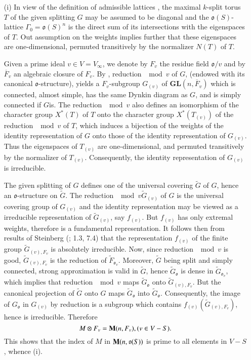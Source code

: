 \begin{itemize}
\item[(i)] In view of the definition of admissible lattices \cite{art04-key10}, the maximal $k$-split torus $T$ of the given splitting $G$ may be assumed to be diagonal and the $\mathfrak{o}(S)$-lattice $\Gamma_{0}=\mathfrak{o}(S)^{n}$ is the direct sum of its intersections with the eigenspaces of $T$. Out assumption on the weights implies further that these eigenspaces are one-dimensional, permuted transitively by the normalizer $N(T)$ of $T$.

Given a prime ideal $v\in V=V_{\infty}$, we denote by $F_{v}$ the residue field $\mathfrak{o}/v$ and by $\overline{F}_{v}$ an algebraic closure of $F_{v}$. By \cite{art04-key10}, reduction $\mod v$ of $G$, (endowed with its canonical $\mathfrak{o}$-structure), yields a $F_{v}$-subgroup $G_{(v)}$ of $\mathbf{GL}(n,\overline{F}_{v})$ which is connected, almost simple, has the same Dynkin diagram as $G$, and is simply connected if $G$\pageoriginale is. The reduction $\mod v$ also defines an isomorphism of the character group $X^{*}(T)$ of $T$ onto the character group $X^{*}(T_{(v)})$ of the reduction $\mod v$ of $T$, which induces a bijection of the weights of the identity representation of $G$ onto those of the identity representation of $G_{(v)}$. Thus the eigenspaces of $T_{(v)}$ are one-dimensional, and permuted transitively by the normalizer of $T_{(v)}$. Consequently, the identity representation of $G_{(v)}$ is irreducible.

The given splitting of $G$ defines one of the universal covering $\widetilde{G}$ of $G$, hence an $\mathfrak{o}$-structure on $\widetilde{G}$. The reduction $\mod v\widetilde{G}_{(v)}$ of $G$ is the universal covering group of $G_{(v)}$ and the identity representation may be viewed as a irreducible representation of $\widetilde{G}_{(v)}$, say $f_{(v)}$. But $f_{(v)}$ has only extremal weights, therefore is a fundamental representation. It follows then from results of Steinberg (\cite{art04-key30}; 1.3, 7.4) that the representation $f_{(v)}$ of the finite group $\widetilde{G}_{(v),F_{v}}$ is absolutely irreducible. Now, since reduction $\mod v$ is good, $\widetilde{G}_{(v),F_{v}}$ is the reduction of $\widetilde{F}_{\mathfrak{o}_{v}}$. Moreover, $\widetilde{G}$ being split and simply connected, strong approximation is valid in $\widetilde{G}$, hence $\widetilde{G}_{\mathfrak{o}}$ is dense in $\widetilde{G}_{\mathfrak{o}_{v}}$, which implies that reduction $\mod v$ maps $\widetilde{G}_{\mathfrak{o}}$ onto $\widetilde{G}_{(v),F_{v}}$. But the canonical projection of $\widetilde{G}$ onto $G$ maps $\widetilde{G}_{\mathfrak{o}}$ into $\widetilde{G}_{\mathfrak{o}}$. Consequently, the image of $G_{\mathfrak{o}}$ in $G_{(v)}$ by reduction is a subgroup which contains $f_{(v)}(\widetilde{G}_{(v),F_{v}})$, hence is irreducible. Therefore
$$
M\otimes F_{v}=\mathbf{M}(n,F_{v}), (v\in V-S).
$$
This shows that the index of $M$ in $\mathbf{M}(n,\mathfrak{o}(S))$ is prime to all elements in $V-S$, whence (i).


\end{itemize}
